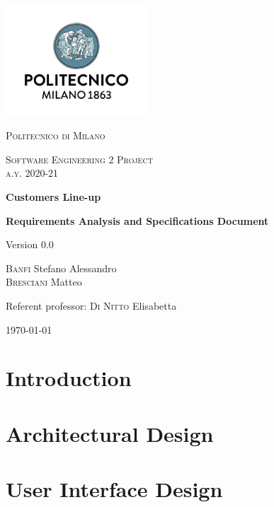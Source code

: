 \documentclass[fontsize=11pt,paper=a4,pagesize=auto]{report}
\begin{document}
\begin{titlepage}
	\centering
	\includegraphics[width=150pt]{images/polimi.jpg}\par\vspace{1cm}
	{\scshape\LARGE
		Politecnico di Milano\par}
	\vspace{1cm}
	{\scshape\Large
		Software Engineering 2 Project\\
		a.y. 2020-21\par}
	\vspace{1.5cm}
	{\huge\bfseries
		Customers Line-up\\\par}
	{\Large\bfseries
		Requirements Analysis and Specifications Document\par}
	Version 0.0\par
	\vspace{2cm}
	{\Large
		{\scshape Banfi}  Stefano Alessandro\\
		{\scshape Bresciani} Matteo\par}
	\vfill
	Referent professor: {\scshape Di Nitto} Elisabetta\par
	\vfill
	{\large\today\par}
\end{titlepage}



\tableofcontents

\chapter{Introduction}



\chapter{Architectural Design}



\chapter{User Interface Design}

\end{document}
